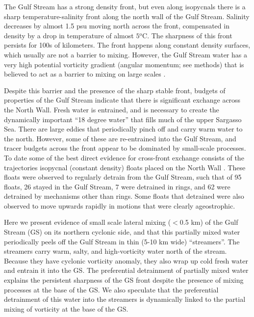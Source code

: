 \documentclass{natureJMK}
\begin{document}
The Gulf Stream has a strong density front, but even along isopycnals there is a  sharp temperature-salinity front along the north wall of the Gulf Stream.  Salinity decreases by almost 1.5 psu moving north across the front, compensated in density by a drop in temperature of almost $5\mathrm{^oC}$.   The sharpness of this front persists for 100s of kilometers.  The front happens along constant density surfaces, which usually are not a barrier to mixing. However, the Gulf Stream water has a very high potential vorticity gradient (angular momentum; see methods) that is believed to act as a barrier to mixing on large scales \cite{marshalletal06,naveiraetal11}.  

Despite this  barrier and the presence of the sharp stable front, budgets of properties of the Gulf Stream indicate that there is significant exchange across the North Wall\cite{joyceetal13}.  Fresh water is entrained, and is necessary to create the dynamically important ``18 degree water'' that fills much of the upper Sargasso Sea. There are large eddies that periodically pinch off and carry warm water to the north. However, some of these are re-entrained into the Gulf Stream, and tracer budgets across the front appear to be dominated by small-scale processes\cite{boweretal85}. To date some of the best direct evidence for cross-front exchange consists of the trajectories isopycnal (constant density) floats placed on the North Wall \cite{bowerrossby89,bowerlozier94}.  These floats were observed to regularly detrain from the Gulf Stream, such that of 95 floats, 26 stayed in the Gulf Stream, 7 were detrained in rings, and 62 were detrained by mechanisms other than rings\cite{bowerlozier94}.  Some floats that detrained were also observed to move upwards rapidly in motions that were clearly ageostrophic.  

Here we present evidence of small scale lateral mixing ($<$0.5 km)  of the Gulf Stream (GS) on its northern cyclonic side, and that this partially mixed water periodically peels off the Gulf Stream in thin (5-10 km wide) ``streamers''.  The streamers carry  warm, salty, and high-vorticity  water north of the stream.  Because they have cyclonic vorticity anomaly, they also wrap up cold fresh water and entrain it into the GS.  The preferential detrainment of partially mixed water explains the persistent sharpness of the GS front despite the presence of mixing processes at the base of the GS.  We also speculate that the preferential detrainment of this water into the streamers is dynamically linked to the partial mixing of vorticity at the base of the GS. 
\end{document}
